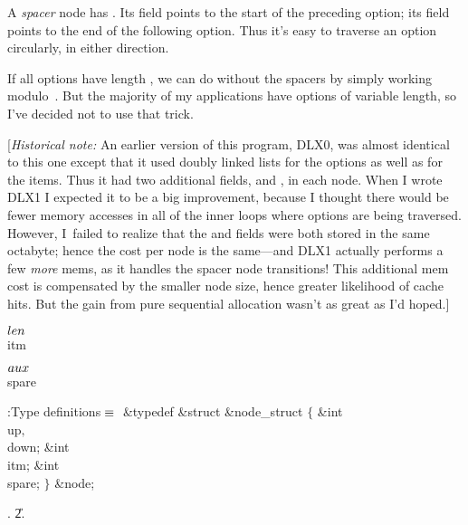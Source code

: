 A {\it spacer\/} node has . Its  field points
to the start
of the preceding option; its  field points to the end of the
following option.
Thus it's easy to traverse an option circularly, in either direction.

If all options have length , we can do without the spacers by simply
working modulo~. But the majority of my applications have options of
variable length, so I've decided not to use that trick.

[{\it Historical note:\/} An earlier version of this program, {\mc DLX0},
was almost identical to this one except that it used doubly linked lists
for the options as well as for the items. Thus it had two additional
fields,  and , in each node. When I wrote {\mc DLX1}
I expected
it to be a big improvement, because I thought there would be fewer memory
accesses in all of the inner loops where options are being traversed. However,
I~failed to realize that the  and  fields were both
stored in the
same octabyte; hence the cost per node is the same---and
{\mc DLX1} actually performs a few {\it more\/} mems, as
it handles the spacer node transitions! This additional mem cost is
compensated by the smaller node size, hence greater likelihood of cache hits.
But the gain from pure sequential allocation wasn't as great as I'd hoped.]

\Y\B\4\D$\\{len}$ \5
\\{itm}\par
\B\4\D$\\{aux}$ \5
\\{spare}\par
\Y\B\4:Type definitions\X${}\equiv{}$\6
\&{typedef} \&{struct} \&{node\_struct} ${}\{{}$\1\6
\&{int} \\{up}${},{}$ \\{down};\6
\&{int} \\{itm};\6
\&{int} \\{spare};\2\6
${}\}{}$ \&{node};\par
{}.
\U2.\fi

